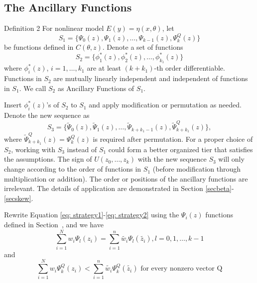 \documentclass[12pt]{TD-CJS}
\begin{document}
\subsection{The Ancillary Functions} 
\begin{theorem}{Definition 2}{}\label{anci}
    For nonlinear model $E(y) = \eta(x,\theta)$, let \[S_1 = \{\Psi_0(z), \Psi_1(z), \ldots,\Psi_{k-1}(z) ,\Psi_k^Q(z)\}\] be functions defined in $C(\theta,z)$. Denote a set of functions \[ S_2 =\{\phi^*_1(z), \phi^*_2(z),\ldots, \phi^*_{k_1}(z)\}\] where $\phi^*_i(z)$, $i=1,\ldots,k_1$ are at least $(k+k_1)$-th order differentiable. Functions in $S_2$ are mutually linearly independent and independent of functions in $S_1$. We call $S_2$ as Ancillary Functions of $S_1$.
\end{theorem}

  Insert $\phi_i^*(z)$'s of $S_2$ to $S_1$ and apply modification or permutation as needed. Denote the new sequence as  \[S_3 = \{\tilde{\Psi}_0(z), \tilde{\Psi}_1(z), \ldots,\tilde{\Psi}_{k+k_1-1}(z), \tilde{\Psi}_{k+k_1}^Q(z)\},\]
  where $\tilde{\Psi}_{k+k_1}^Q(z) = \Psi_{k}^Q(z)$ is required after permutation. For a proper choice of $S_2$, working with $S_3$ instead of $S_1$ could form a better organized tier that satisfies the assumptions. The sign of $U(z_0,\ldots,z_k)$ with the new sequence $S_3$ will only change according to the order of functions in $S_1$ (before modification through multiplication or addition). The order or positions of the ancillary functions are irrelevant. The details of application are demonstrated in Section \ref{secbeta}-\ref{secskew}.


Rewrite Equation \eqref{eq: strategy1}-\eqref{eq: strategy2} using the $\Psi_i(z)$ functions defined in Section~\label{metho}, and we have
\begin{equation} \label{eq: st1}
\sum_{i=1}^Nw_i\Psi_l(z_i)=\sum_{i=1}^n\tilde{w_i}\Psi_l(\tilde{z_i}), l=0,1,\ldots, k-1
\end{equation} and \begin{equation} \label{eq: st2}
\sum_{i=1}^Nw_i\Psi_k^Q(z_i)<\sum_{i=1}^n\tilde{w_i}\Psi_k^Q(\tilde{z_i}) \text{  for every nonzero vector Q}
\end{equation}  
\end{document}
